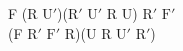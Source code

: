 F (R $\text{U}'$)($\text{R}'$ $\text{U}'$ R U) $\text{R}'$ $\text{F}'$\\
(F $\text{R}'$ $\text{F}'$ R)(U R $\text{U}'$ $\text{R}'$)\\
